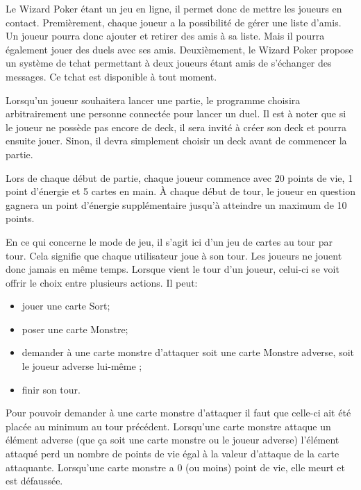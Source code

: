 \documentclass[11pt,a4paper]{article}
\begin{document}
\medbreak

Le Wizard Poker étant un jeu en ligne, il permet donc de mettre les joueurs en contact. Premièrement, chaque joueur a la possibilité de gérer une liste d'amis. Un joueur pourra donc ajouter et retirer des amis à sa liste. Mais il pourra également jouer des duels avec ses amis. Deuxièmement, le Wizard Poker propose un système de \gls{tchat} permettant à deux joueurs étant amis de s'échanger des messages.  Ce tchat est disponible à tout moment.

\medbreak

Lorsqu'un joueur souhaitera lancer une partie, le programme choisira arbitrairement une personne connectée pour lancer un duel. Il est à noter que si le joueur ne possède pas encore de deck, il sera invité à créer son deck et pourra ensuite jouer. Sinon, il devra simplement choisir un deck avant de commencer la partie.

\medbreak

Lors de chaque début de partie, chaque joueur commence avec 20 points de vie, 1 point d'énergie et 5 cartes en main. À chaque début de tour, le joueur en question gagnera un point d'énergie supplémentaire jusqu'à atteindre un maximum de 10 points.

\medbreak

En ce qui concerne le mode de jeu, il s'agit ici d'un jeu de cartes au tour par tour.  Cela signifie que chaque utilisateur joue à son tour.  Les joueurs ne jouent donc jamais en même temps.  Lorsque vient le tour d'un joueur, celui-ci se voit offrir le choix entre plusieurs actions. Il peut:

\begin{itemize}
 \item[\textbullet] jouer une carte Sort;
 \item[\textbullet] poser une carte Monstre;
 \item[\textbullet] demander à une carte monstre d'attaquer soit une carte Monstre adverse, soit le joueur adverse lui-même ;
 \item[\textbullet] finir son tour.
\end{itemize}

Pour pouvoir demander à une carte monstre d'attaquer il faut que celle-ci ait été placée au minimum au tour précédent.  Lorsqu'une carte monstre attaque un élément adverse (que ça soit une carte monstre ou le joueur adverse) l'élément attaqué perd un nombre de points de vie égal à la valeur d'attaque de la carte attaquante. Lorsqu'une carte monstre a 0 (ou moins) point de vie, elle meurt et est défaussée.
\end{document}
